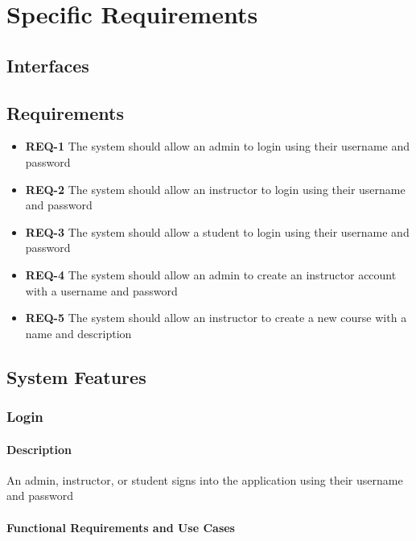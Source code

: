 \documentclass{article}
\begin{document}
\newpage
\section{Specific Requirements}

\subsection{Interfaces}

\subsection{Requirements}

\begin{itemize}
  \item \textbf{REQ-1} The system should allow an admin to login using their username and password
  \item \textbf{REQ-2} The system should allow an instructor to login using their username and password
  \item \textbf{REQ-3} The system should allow a student to login using their username and password
  \item \textbf{REQ-4} The system should allow an admin to create an instructor account with a username and password
  \item \textbf{REQ-5} The system should allow an instructor to create a new course with a name and description

\end{itemize}

\subsection{System Features}

\subsubsection{Login}

\paragraph{Description} An admin, instructor, or student signs into the application using their username and password

\paragraph{Functional Requirements and Use Cases}
\end{document}
